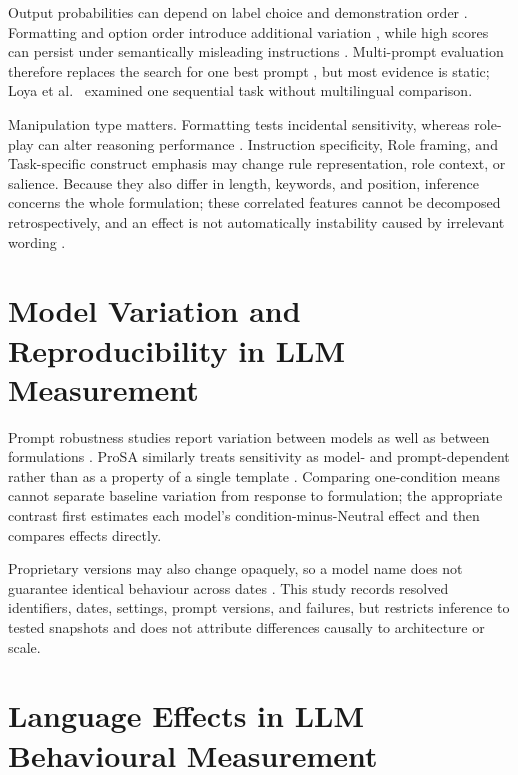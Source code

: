 \documentclass[logo,msc,inf]{infthesis}       %
\begin{document}
Output probabilities can depend on label choice and demonstration order \cite{Zhao2021Calibrate,Lu2022PromptOrder}. Formatting and option order introduce additional variation \cite{Sclar2024PromptFormatting,Pezeshkpour2024OptionOrder}, while high scores can persist under semantically misleading instructions \cite{Webson2022PromptMeaning}. Multi-prompt evaluation therefore replaces the search for one best prompt \cite{Mizrahi2024MultiPrompt,Zhuo2024ProSA}, but most evidence is static; Loya et al.~\cite{Loya2023PromptSensitivityDecision} examined one sequential task without multilingual comparison.

Manipulation type matters. Formatting tests incidental sensitivity, whereas role-play can alter reasoning performance \cite{Kong2024RolePlayPrompting}. Instruction specificity, Role framing, and Task-specific construct emphasis may change rule representation, role context, or salience. Because they also differ in length, keywords, and position, inference concerns the whole formulation; these correlated features cannot be decomposed retrospectively, and an effect is not automatically instability caused by irrelevant wording \cite{Sclar2024PromptFormatting,Hua2025FlawArtifact}.

\section{Model Variation and Reproducibility in LLM Measurement}

Prompt robustness studies report variation between models as well as between formulations \cite{Sclar2024PromptFormatting,Mizrahi2024MultiPrompt}. ProSA similarly treats sensitivity as model- and prompt-dependent rather than as a property of a single template \cite{Zhuo2024ProSA}. Comparing one-condition means cannot separate baseline variation from response to formulation; the appropriate contrast first estimates each model's condition-minus-Neutral effect and then compares effects directly.

Proprietary versions may also change opaquely, so a model name does not guarantee identical behaviour across dates \cite{Chen2024ChatGPTBehavior,Palmer2024ProprietaryModels}. This study records resolved identifiers, dates, settings, prompt versions, and failures, but restricts inference to tested snapshots and does not attribute differences causally to architecture or scale.

\section{Language Effects in LLM Behavioural Measurement}
\end{document}
